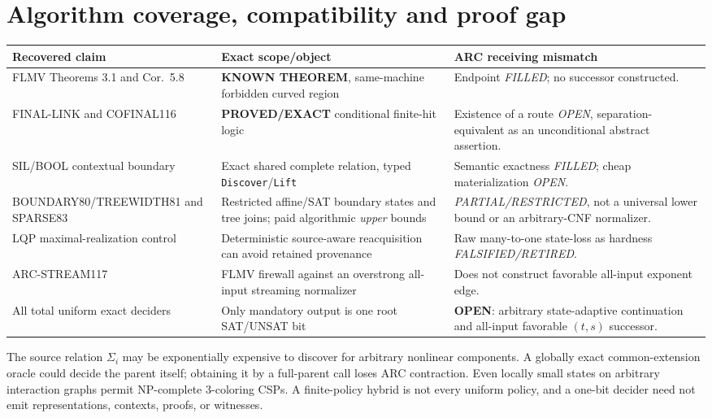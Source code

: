 \documentclass[11pt]{article}
\begin{document}
\section{Algorithm coverage, compatibility and proof gap}
\begin{center}\small
\begin{tabular}{p{.24\linewidth}p{.36\linewidth}p{.29\linewidth}}
\toprule
Recovered claim & Exact scope/object & ARC receiving mismatch\\
\midrule
FLMV Theorems 3.1 and Cor.\ 5.8 &
\textbf{KNOWN THEOREM}, same-machine forbidden curved region &
Endpoint \emph{FILLED}; no successor constructed.\\
FINAL-LINK and COFINAL116 &
\textbf{PROVED/EXACT} conditional finite-hit logic &
Existence of a route \emph{OPEN}, separation-equivalent as an
unconditional abstract assertion.\\
SIL/BOOL contextual boundary &
Exact shared complete relation, typed \texttt{Discover}/\texttt{Lift} &
Semantic exactness \emph{FILLED}; cheap materialization \emph{OPEN}.\\
BOUNDARY80/TREEWIDTH81 and SPARSE83 &
Restricted affine/SAT boundary states and tree joins; paid algorithmic
\emph{upper} bounds & \emph{PARTIAL/RESTRICTED}, not a universal
lower bound or an arbitrary-CNF normalizer.\\
LQP maximal-realization control &
Deterministic source-aware reacquisition can avoid retained provenance &
Raw many-to-one state-loss as hardness \emph{FALSIFIED/RETIRED}.\\
ARC-STREAM117 &
FLMV firewall against an overstrong all-input streaming normalizer &
Does not construct favorable all-input exponent edge.\\
All total uniform exact deciders &
Only mandatory output is one root SAT/UNSAT bit &
\textbf{OPEN}: arbitrary state-adaptive continuation and all-input
favorable \((t,s)\) successor.\\
\bottomrule
\end{tabular}
\end{center}
The source relation \(\Sigma_i\) may be exponentially expensive to
discover for arbitrary nonlinear components. A globally exact
common-extension oracle could decide the parent itself; obtaining
it by a full-parent call loses ARC contraction. Even locally
small states on arbitrary interaction graphs permit NP-complete
3-coloring CSPs. A finite-policy hybrid is not every uniform policy,
and a one-bit decider need not emit representations, contexts,
proofs, or witnesses.
\end{document}
